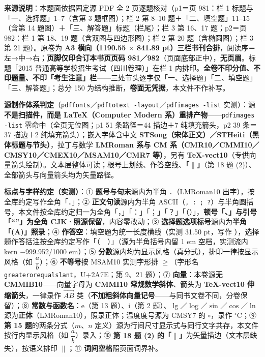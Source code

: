 


\begin{gktip}
\textbf{来源说明}：本题面依据固定源 PDF 全 2 页逐题核对（p1＝页 981：栏 1 标题与「一、选择题」1–7（含第 3 题框图）；栏 2 第 8–10 题＋「二、填空题」11–15（含第 14 题图）＋「三、解答题」标题（栏尾）；栏 3 第 16、17 题；p2＝页 982：栏 1 第 18、19 题（含双图与四边形图）；栏 2 第 20 题（含椭圆图）；栏 3 第 21 题）。原卷为 \textbf{A3 横向（1190.55 \(\times\) 841.89 pt）三栏书刊合排}，阅读序＝左→中→右；\textbf{页脚仅印合订本书页页码 981／982}（页面底部正中），\textbf{无页眉}。标题「2015 普通高等学校招生考试（四川卷理）」在栏 1 内排印。\textbf{全卷不印分值、不印题量、不印「考生注意」栏}——三处节头逐字仅「一、选择题」「二、填空题」「三、解答题」；总分 150 为结构推断，\textbf{卷面无凭据}，本文件不作补写。

\textbf{源制作体系判定}（\texttt{pdffonts}／\texttt{pdftotext -layout}／\texttt{pdfimages -list} 实测）：源\textbf{不是扫描件，而是 LaTeX（Computer Modern 系）重排产物}——\texttt{pdfimages -list} 零命中（全页无位图；p1 51 条路径＝44 描边＋7 纯填充箭头，p2 39 条＝37 描边＋2 纯填充箭头）；嵌入字体含中文 \textbf{STSong（宋体正文）／STHeiti（黑体标题与节头）}，拉丁与数学 \textbf{LMRoman 系与 CM 系（CMR10／CMMI10／CMSY10／CMEX10／MSAM10／CMR7 等）}，另有 \textbf{TeX-vect10}（专供向量箭头绘制）。文本层整体可读；根号上划线、作答空线、\textbf{「$\parallel$」}（第 18 题 (2)）、全部箭头与向量箭头均为矢量路径。

\textbf{标点与字样约定（实测）}：① \textbf{题号与句末}源内为半角 \texttt{.}（LMRoman10 出字），按全库约定写作全角「．」；② \textbf{正文句读}源内为半角 ASCII（\texttt{, : ; ?}）与半角圆括号，本文件按全库约定归一为全角「，」「：」「；」「？」「（）」，\textbf{顿号「、」与引号「“”」为全角 CJK·照源保留}，内容零改动；③ \textbf{选择题选项标号}源内为\textbf{半角「(A)」照录}；④ \textbf{作答空}：填空题为统一长度横线（实测 31.50 pt，写作 \texttt{\gkblank{}}），选择题作答括注按全库约定写作「（　）」（源为半角括号内留 1 em 空档，实测流内 kern $-$999.952/1000 em）；⑤ \textbf{分数}源内均为显示风格（真分式），排印一律按显示风格（如 \(\dfrac{a}{b}\)）；⑥ \textbf{不等号}按 MSAM10 实测字形排 \(\geqslant\)（字形名 \texttt{greaterorequalslant}，U+2A7E；第 9、21 题）；⑦ \textbf{向量}：本卷源\textbf{无 CMMIB10}——向量字母为 \textbf{CMMI10 常规数学斜体}、箭头为 \textbf{TeX-vect10 伸缩箭头}，一律录作 \(\overrightarrow{AB}\) 类（\textbf{不加粗斜体向量记号}——与同书文卷不同，分卷保留）；⑧ \textbf{常数与函数名}：\(\mathrm{e}\)（第 13 题）、\(\mathrm{i}\)（第 2 题）、\(\lg\)／\(\log\)／\(\sin\)／\(\cos\)／\(\ln\) 源为\textbf{正体}（LMRoman10），照录正体；温度度号源为 CMSY7 的 \(\circ\)，录作 \(^{\circ}\mathrm{C}\)；⑨ \textbf{第 15 题}的两条分式（\(m\)、\(n\) 定义）源为行间尺寸显示式与同行文字共存，本文件按行内显示风格（如 \(\dfrac{a}{b}\)）录入；⑩ \textbf{第 18 题 (2) 的「$\parallel$」}为矢量描边（文本层缺失），按语义排印 \(\parallel\)；⑪ \textbf{词间空格}照页面词界补。


\end{gktip}
